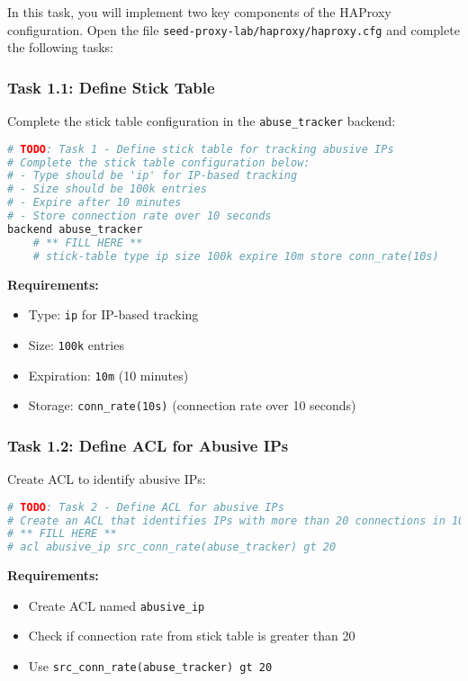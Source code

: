 \documentclass[12pt]{article}
\begin{document}
In this task, you will implement two key components of the HAProxy configuration. Open the file \texttt{seed-proxy-lab/haproxy/haproxy.cfg} and complete the following tasks:

\subsubsection{Task 1.1: Define Stick Table}
Complete the stick table configuration in the \texttt{abuse\_tracker} backend:

\begin{lstlisting}[language=bash, caption=HAProxy Configuration - Task 1.1]
# TODO: Task 1 - Define stick table for tracking abusive IPs
# Complete the stick table configuration below:
# - Type should be 'ip' for IP-based tracking
# - Size should be 100k entries
# - Expire after 10 minutes
# - Store connection rate over 10 seconds
backend abuse_tracker
    # ** FILL HERE **
    # stick-table type ip size 100k expire 10m store conn_rate(10s)
\end{lstlisting}

\textbf{Requirements:}
\begin{itemize}
    \item Type: \texttt{ip} for IP-based tracking
    \item Size: \texttt{100k} entries
    \item Expiration: \texttt{10m} (10 minutes)
    \item Storage: \texttt{conn\_rate(10s)} (connection rate over 10 seconds)
\end{itemize}

\subsubsection{Task 1.2: Define ACL for Abusive IPs}
Create ACL to identify abusive IPs:

\begin{lstlisting}[language=bash, caption=HAProxy Configuration - Task 1.2]
# TODO: Task 2 - Define ACL for abusive IPs
# Create an ACL that identifies IPs with more than 20 connections in 10 seconds
# ** FILL HERE **
# acl abusive_ip src_conn_rate(abuse_tracker) gt 20
\end{lstlisting}

\textbf{Requirements:}
\begin{itemize}
    \item Create ACL named \texttt{abusive\_ip}
    \item Check if connection rate from stick table is greater than 20
    \item Use \texttt{src\_conn\_rate(abuse\_tracker) gt 20}
\end{itemize}
\end{document}
